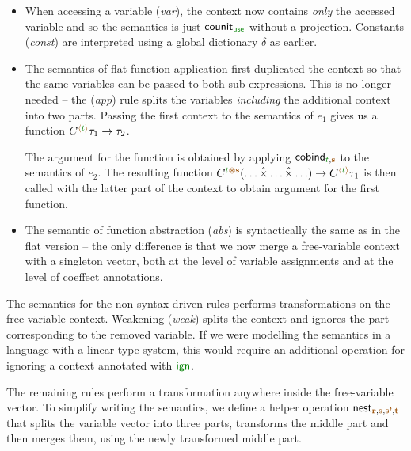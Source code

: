 \begin{itemize}
\item When accessing a variable (\emph{var}), the context now contains \emph{only} the accessed
  variable and so the semantics is just $\ident{counit}_{\cunit}$ without a projection.
  Constants (\emph{const}) are interpreted using a global dictionary $\delta$ as earlier.

\item The semantics of flat function application first duplicated the context so that the same 
  variables can be passed to both sub-expressions. This is no longer needed -- the 
  (\emph{app}) rule splits the variables \emph{including} the additional context into two parts.
  Passing the first context to the semantics of $e_1$ gives us a function
  $\ctyp{\alift{\cclrd{t}}}{\tau_1} \rightarrow \tau_2$. 

  The argument for the function is obtained by applying $\ident{cobind}_{\cclrd{t}, \aclrd{\textbf{s}}}$ 
  to the semantics of $e_2$. The resulting function 
  $\ctyp{\cclrd{t}\aseq\aclrd{\textbf{s}}}{(\ldots \xtimes \ldots \xtimes \ldots)} \rightarrow \ctyp{\alift{\cclrd{t}}}{\tau_1}$
  is then called with the latter part of the context to obtain argument for the first function.

\item The semantic of function abstraction (\emph{abs}) is syntactically the same as in the 
  flat version -- the only difference is that we now merge a free-variable context with a 
  singleton vector, both at the level of variable assignments and at the level of coeffect 
  annotations.
\end{itemize}

The semantics for the non-syntax-driven rules performs transformations on the 
free-variable context. Weakening (\emph{weak}) splits the context and ignores the part corresponding
to the removed variable. If we were modelling the semantics in a language with a linear 
type system, this would require an additional operation for ignoring a context annotated with 
$\aclrd{\czero}$.

The remaining rules perform a transformation anywhere inside the free-variable vector. 
To simplify writing the semantics, we define a helper operation 
$\ident{nest}_{\aclrd{\textbf{r}}, \aclrd{\textbf{s}}, \aclrd{\textbf{s'}}, \aclrd{\textbf{t}}}$
that splits the variable vector into three parts, transforms the middle part and then 
merges them, using the newly transformed middle part.

